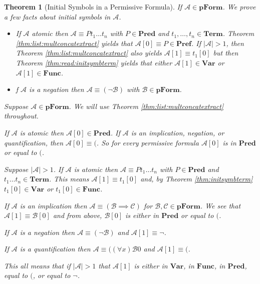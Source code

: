 \documentclass[12pt]{article}
\theoremstyle{break}
\theoremstyle{break}
\newtheorem{theorem}{Theorem}[section]
\theoremstyle{break}
\theoremstyle{break}
\theoremstyle{break}
\newtheorem{informal definition}[definition]{Informal Definition}
\newcommand{\mc}[1]{\mathcal{#1}}
\begin{document}
\begin{theorem}[Initial Symbols in a Permissive Formula]
\label{thm:initsymbform}
If $\mc{A}\in\textbf{pForm}$.
We prove a few facts about initial symbols in $\mc{A}$.
\begin{itemize}
\item{If $\mc{A}$ atomic then $\mc{A}\equiv P t_1\ldots t_n$ with $P\in\textbf{Pred}$ and $t_1,\ldots, t_n\in\textbf{Term}$. Theorem \ref{thm:list:multconcatextract} yields that $\mc{A}[0] \equiv P\in\textbf{Pref}$. If $|\mc{A}|>1$, then Theorem \ref{thm:list:multconcatextract} also yields $\mc{A}[1]\equiv t_1[0]$ but then Theorem \ref{thm:read:initsymbterm} yields that either $\mc{A}[1]\in\textbf{Var}$ or $\mc{A}[1]\in\textbf{Func}$.}
\item{f $\mc{A}$ is a negation then $\mc{A}\equiv (\lnot \mc{B})$ with $\mc{B}\in\textbf{pForm}$.}
\end{itemize}


Suppose $\mc{A}\in \textbf{pForm}$.
We will use Theorem \ref{thm:list:multconcatextract} throughout.

If $\mc{A}$ is atomic then $\mc{A}[0] \in \textbf{Pred}$.
If $\mc{A}$ is an implication, negation, or quantification, then $\mc{A}[0] \equiv ($. So for every permissive formula $\mc{A}[0]$ is in $\textbf{Pred}$ or equal to $($.

Suppose $|\mc{A}| > 1$.
If $\mc{A}$ is atomic then $\mc{A}\equiv Pt_1\ldots t_n$ with $P\in\textbf{Pred}$ and $t_1\ldots t_n\in\textbf{Term}$.
This means $\mc{A}[1]\equiv t_1[0]$ and, by Theorem \ref{thm:initsymbterm} $t_1[0]\in\textbf{Var}$ or $t_1[0]\in\textbf{Func}$.

If $\mc{A}$ is an implication then $\mc{A}\equiv (\mc{B}\implies \mc{C})$ for $\mc{B},\mc{C}\in\textbf{pForm}$.
We see that $\mc{A}[1]\equiv \mc{B}[0]$ and from above, $\mc{B}[0]$ is either in $\textbf{Pred}$ or equal to $($.

If $\mc{A}$ is a negation then $\mc{A}\equiv (\lnot \mc{B})$ and $\mc{A}[1] \equiv \lnot$.

If $\mc{A}$ is a quantification then $\mc{A}\equiv ((\forall x)\mc{B}0$ and $\mc{A}[1] \equiv ($.

This all means that if $|\mc{A}|>1$ that $\mc{A}[1]$ is either in $\textbf{Var}$, in $\textbf{Func}$, in $\textbf{Pred}$, equal to $($, or equal to $\lnot$.
\end{theorem}
\end{document}

